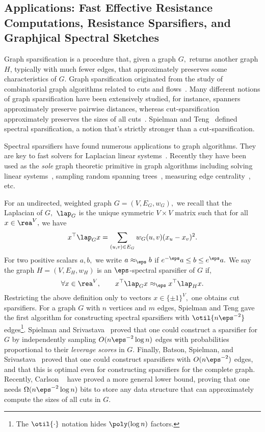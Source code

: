 \subsection{Applications: Fast Effective Resistance Computations,
  Resistance Sparsifiers, and Graphjical Spectral Sketches}

Graph sparsification is a procedure that, given a graph $G,$ returns
another graph $H$, typically with much fewer edges, that approximately
preserves some characteristics of $G$. Graph sparsification originated
from the study of combinatorial graph algorithms related to cuts and
flows~\cite{BenczurK96, EppsteinGIN97}. Many different notions of
graph sparsification have been extensively studied, for instance,
spanners~\cite{Chew86} approximately preserve pairwise distances,
whereas cut-sparsification approximately preserves the sizes of all
cuts~\cite{BenczurK96}.  Spielman and Teng~\cite{SpielmanTengSolver:journal,
  SpielmanT11:journal} defined spectral sparsification, a notion
that's strictly stronger than a cut-sparsification.

Spectral sparsifiers have found numerous applications to graph
algorithms.  They are key to fast solvers for Laplacian linear
systems~\cite{SpielmanTengSolver:journal, SpielmanT11:journal,
  KoutisMP10, KoutisMP11}.  Recently they have been used as the
\emph{sole} graph theoretic primitive in graph algorithms including
solving linear systems~\cite{PengS14, KyngLPSS16}, sampling random
spanning trees~\cite{DurfeeKPRS17, DurfeeKPRS17}, measuring edge
centrality~\cite{LiZ18,LiPSYZ18:arxiv}, etc.


For an undirected, weighted graph $G = (V, E_G, w_G),$ we recall that
the Laplacian of $G,$ $\lap_G$ is the unique symmetric $V \times V$
matrix such that for all $x \in \rea^{V},$ we have
\[
  x^{\top}\lap_G x = \sum_{(u,v) \in E_G} w_G(u,v)(x_u - x_v)^{2}.
\]
For two positive scalars $a, b,$ we write $a \approx_{\eps} b$ if
$e^{-\eps} a \le b \le e^{\eps} a.$ We say the graph
$H = (V, E_H, w_H)$ is an $\eps$-spectral sparsifier of $G$ if,
\begin{equation}
  \label{eq:intro:forall-sparsifier}
  \forall x \in \rea^V, \qquad  x^{\top}\lap_Gx \approx_{\eps} x^{\top} \lap_H x.
\end{equation}
Restricting the above definition only to vectors
$x \in \{\pm 1\}^{V},$ one obtains cut sparsifiers. For a graph $G$
with $n$ vertices and $m$ edges, Spielman and Teng gave the first
algorithm for constructing spectral sparsifiers with
$\otil{n\eps^{-2}}$ edges\footnote{The $\otil{\cdot}$ notation hides
  $\poly(\log n)$ factors.}. Spielman and Srivastava~\cite{SpielmanS08:journal}
proved that one could construct a sparsifier for $G$ by independently
sampling $O(n \eps^{-2} \log n)$ edges with probabilities proportional
to their \emph{leverage scores} in $G.$ Finally, Batson, Spielman, and
Srivastava~\cite{BatsonSS12} proved that one could construct
sparsifiers with $O(n\eps^{-2})$ edges, and that this is optimal even
for constructing sparsifiers for the complete graph. Recently,
Carlson \etal~\cite{CarlsonKNT17:arxiv} have proved a more general lower
bound, proving that one needs $\Omega(n\eps^{-2} \log n)$ bits to
store any data structure that can approximately compute the sizes of
all cuts in $G.$

